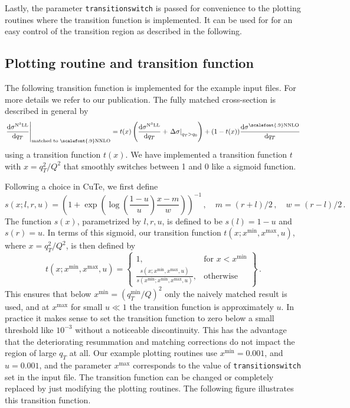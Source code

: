 \documentclass[
  11pt]{scrartcl}
\newcommand{\abbrev}{\scalefont{.9}}
\newcommand{\NNLO}{\text{\abbrev NNLO}}
\begin{document}
Lastly, the parameter \texttt{transitionswitch} is passed for
convenience to the plotting routines where the transition function is
implemented. It can be used for for an easy control of the transition
region as described in the following.

\hypertarget{plotting-and-transition}{%
\subsection{Plotting routine and transition function}\label{plotting-and-transition}}

The following transition function is implemented for the example
input files. For more details we refer to our publication. The fully
matched cross-section is described in general by 
\begin{equation}\label{eq:matchingmod}
\left.\frac{\mathrm{d}\sigma^{\text{N$^3$LL}}}{\mathrm{d}q_T}\right|_\text{matched to \NNLO{}} 
=  t(x) \left( \frac{\mathrm{d}\sigma^{\text{N$^3$LL}}}{\mathrm{d}q_T} + 
\left.\Delta\sigma\right|_{q_T>q_0} \right)
+ (1-t(x)) \frac{\mathrm{d}\sigma^\NNLO{}}{\mathrm{d}q_T}\,
\end{equation}
using a transition function $t(x)$. We have implemented a transition function $t$
with $x=q_T^2/Q^2$ that smoothly switches between 1 and 0 like a sigmoid function.

Following a choice in CuTe, we first define
\[
s(x;l,r,u) = \left (1 + \exp\left(\log\left(\frac{1-u}{u}\right) \frac{x-m}{w}\right) \right 
)^{-1}\,,\quad
m = (r+l)/2\,,\quad w = (r-l)/2\,.
\]
The function $s(x)$, parametrized by $l,r,u$, is defined to be $s(l)=1-u$ and $s(r)=u$.
In terms of this sigmoid, our transition function $t(x; x^\text{min},x^\text{max},u)$, where $x=q_T^2/Q^2$, is then defined by
\begin{equation}\label{eq:transition}
t(x; x^\text{min},x^\text{max},u) = \left\{\begin{array}{lr}
1 , & \text{for } x < x^\text{min}\\
\frac{s(x; x^\text{min}, x^\text{max},u)}{s(x^\text{min}; x^\text{min}, x^\text{max},u)}, & 
\text{otherwise}
\end{array}\right\}\,.
\end{equation}
This ensures that below $x^\text{min}=(q_T^\text{min}/Q)^2$ only the naively matched result is 
used, and at
$x^\text{max}$
for small $u\ll1$ the transition function is approximately $u$. In practice it makes sense to set 
the transition
function to zero below a small threshold like $10^{-3}$ without a noticeable discontinuity.
This has the advantage that the deteriorating resummation and matching corrections do not impact 
the region of 
large $q_T$ at all.
Our example plotting routines use $x^\text{min}=0.001$, and $u=0.001$, and the parameter $x^\text{max}$ corresponds to the value of \texttt{transitionswitch} set in the input file. The transition function can be changed or completely replaced by just modifying the plotting routines. The following figure illustrates this transition function.
\end{document}
